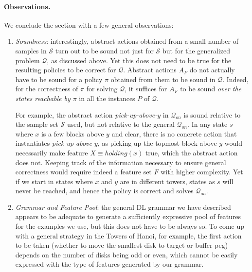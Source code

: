 \documentclass[letterpaper]{article} %
\newcommand{\Q}{\mathcal{Q}}
\begin{document}
% 



\paragraph{Observations.}
We conclude the section with a few general observations:

\begin{enumerate}
\item
\emph{Soundness}: interestingly, abstract actions obtained from a small number of samples in
$\mathcal{S}$ turn out to be sound not just for $\mathcal{S}$ but for the generalized problem $\Q$,
as discussed above. Yet this does not need to be true for the resulting policies to be
correct for $\Q$.
%
Abstract actions $A_F$ do not actually have to be sound for a policy $\pi$
obtained from them to be sound in $\Q$.
Indeed, for the correctness of $\pi$ for solving $\Q$,
it suffices for $A_F$ to be sound \emph{over the states reachable by $\pi$}
in all the instances $P$ of $\Q$.

For example, the abstract action \emph{pick-up-above-$y$} in $\Q_{on}$
is sound relative to the sample set $\mathcal{S}$ used, but not relative to the general
$\Q_{on}$. In any state $s$ where $x$ is a few blocks above $y$ and clear,
there is no concrete action that instantiates \emph{pick-up-above-$y$},
as picking up the topmost block above $y$ would necessarily make feature $X \equiv holding(x)$
true, which the abstract action does not.
%
Keeping track of the information necessary to ensure general correctness would require indeed
a feature set $F$ with higher complexity.
Yet if we start in states where $x$ and $y$ are in different towers,
states as $s$ will never be reached, and hence the policy is correct and solves $\Q_{on}$.


\item
\emph{Grammar and Feature Pool}: the general DL grammar we have described appears to be
adequate to generate a sufficiently expressive pool of features for the examples we use,
but this does not have to be always so.
To come up with a general strategy in the Towers of Hanoi, for example,
the first action to be taken  (whether to move the smallest disk to target or buffer peg)
depends on the number of disks being odd or even,
which cannot be easily expressed with the type of features generated by our grammar.


\end{enumerate}
\end{document}
